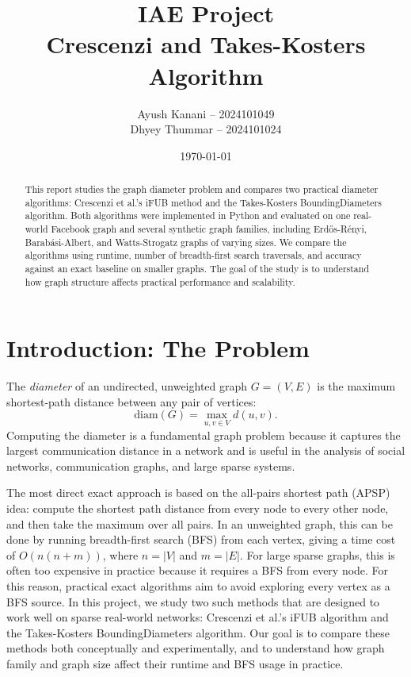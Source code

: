 \documentclass[11pt,a4paper]{article}
\title{IAE Project\\[0.5em]\large Crescenzi and Takes-Kosters Algorithm}
\author{
Ayush Kanani -- 2024101049 \\
Dhyey Thummar -- 2024101024
}
\date{\today}
\begin{document}
\maketitle

\begin{abstract}
This report studies the graph diameter problem and compares two practical
diameter algorithms: Crescenzi et al.'s iFUB method and the Takes-Kosters
BoundingDiameters algorithm. Both algorithms were implemented in Python and
evaluated on one real-world Facebook graph and several synthetic graph
families, including Erd\H{o}s-R\'enyi, Barab\'asi-Albert, and Watts-Strogatz
graphs of varying sizes. We compare the algorithms using runtime, number of
breadth-first search traversals, and accuracy against an exact baseline on
smaller graphs. The goal of the study is to understand how graph structure
affects practical performance and scalability.
\end{abstract}

\section{Introduction: The Problem}

The \emph{diameter} of an undirected, unweighted graph $G=(V,E)$ is the maximum
shortest-path distance between any pair of vertices:
\[
\mathrm{diam}(G) = \max_{u,v \in V} d(u,v).
\]
Computing the diameter is a fundamental graph problem because it captures the
largest communication distance in a network and is useful in the analysis of
social networks, communication graphs, and large sparse systems.

The most direct exact approach is based on the all-pairs shortest path (APSP)
idea: compute the shortest path distance from every node to every other node,
and then take the maximum over all pairs. In an unweighted graph, this can be
done by running breadth-first search (BFS) from each vertex, giving a time cost
of $O(n(n+m))$, where $n = |V|$ and $m = |E|$. For large sparse graphs, this is
often too expensive in practice because it requires a BFS from every node.
For this reason, practical exact algorithms aim to avoid exploring every vertex
as a BFS source. In this project, we study two such methods that are designed
to work well on sparse real-world networks: Crescenzi et al.'s iFUB algorithm
and the Takes-Kosters BoundingDiameters algorithm. Our goal is to compare these
methods both conceptually and experimentally, and to understand how graph
family and graph size affect their runtime and BFS usage in practice.
\end{document}
